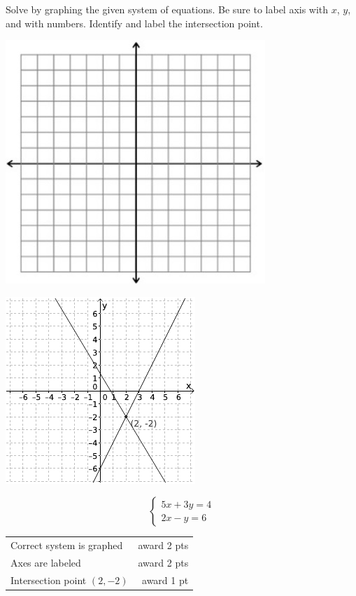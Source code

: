 {
	Solve by graphing the given system of equations. Be sure to label axis with $x$, $y$, and with numbers. Identify and label the intersection point. \begin{onlyproblem}\begin{center}\includegraphics{fig-graphpaper.png}\end{center}\end{onlyproblem} \begin{onlysolution}\begin{center}\includegraphics{fig095-10-b-answer}\end{center}\end{onlysolution}
	$$\begin{cases}5x+3y=4\\ 2x-y=6\end{cases}$$
}
{
	\begin{tabular}{l r}
	Correct system is graphed & award 2 pts\\
	Axes are labeled & award 2 pts\\
	Intersection point $(2,-2)$ & award 1 pt
	\end{tabular}
}

